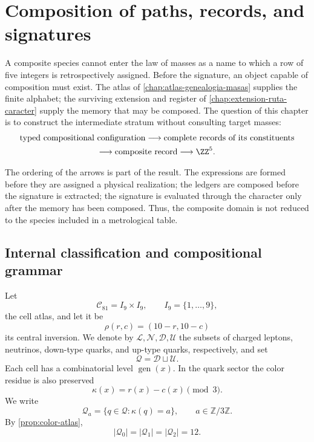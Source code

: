 \chapter{Composition of paths, records, and signatures}
\label{chap:composicion-especies-rev6}

A composite species cannot enter the law of masses as a name to which
a row of five integers is retrospectively assigned. Before the signature,
an object capable of composition must exist. The atlas of
\cref{chap:atlas-genealogia-masas} supplies the finite alphabet; the
surviving extension and register of
\cref{chap:extension-ruta-caracter} supply the memory that may
be composed. The question of this chapter is to construct the intermediate stratum
without consulting target masses:
\[
\begin{gathered}
 \text{typed compositional configuration}
 \longrightarrow
 \text{complete records of its constituents}\\
 \longrightarrow
 \text{composite record}
 \longrightarrow
 \ZZ^5.
\end{gathered}
\]

The ordering of the arrows is part of the result. The expressions are formed before they are assigned a physical realization; the ledgers are composed before the signature is extracted; the signature is evaluated through the character only after the memory has been composed. Thus, the composite domain is not reduced to the species included in a metrological table.

\section{Internal classification and compositional grammar}
\label{sec:alfabeto-composicional-rev6}

Let
\[
 \mathcal C_{81}=I_9\times I_9,
 \qquad I_9=\{1,\ldots,9\},
\]
the cell atlas, and let it be
\[
 \rho(r,c)=(10-r,10-c)
\]
its central inversion. We denote by
\(\mathcal L,\mathcal N,\mathcal D,\mathcal U\) the subsets of
charged leptons, neutrinos, down-type quarks, and up-type quarks,
respectively, and set
\[
 \mathcal Q=\mathcal D\sqcup\mathcal U.
\]
Each cell has a combinatorial level
\(\operatorname{gen}(x)\). In the quark sector the color
residue is also preserved
\[
 \kappa(x)=r(x)-c(x)\pmod3.
\]
We write
\[
 \mathcal Q_a=\{q\in\mathcal Q:\kappa(q)=a\},
 \qquad a\in\mathbb Z/3\mathbb Z.
\]
By \cref{prop:color-atlas},
\[
 |\mathcal Q_0|=|\mathcal Q_1|=|\mathcal Q_2|=12.
\]

